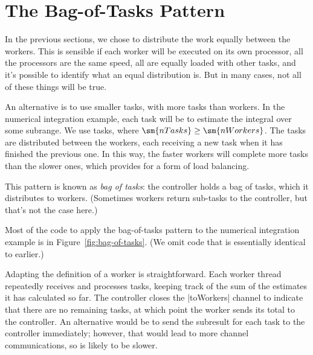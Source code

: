 \section{The Bag-of-Tasks Pattern}

In the previous sections, we chose to distribute the work equally between the
workers.
%
This is sensible if each worker will be executed on its own processor,
all the processors are the same speed, all are equally loaded with other
tasks, and it's possible to identify what an equal distribution is.
%
But in many cases, not all of these things will be true.

An alternative is to use smaller tasks, with more tasks than
workers.
%
In the numerical integration example, each task will be to estimate the
integral over some subrange.   We use  tasks, where
$\sm{nTasks} \ge \sm{nWorkers}$.
%
The tasks are distributed between the workers, each receiving a new task when
it has finished the previous one.  In this way, the faster workers will
complete more tasks than the slower ones, which provides for a form of load
balancing.

This pattern is known as \emph{bag of tasks}: the
controller holds a bag of tasks, which it distributes to workers.  (Sometimes
workers return sub-tasks to the controller, but that's not the case here.)


Most of the code to apply the bag-of-tasks pattern to the numerical
integration example is in Figure~\ref{fig:bag-of-tasks}.  (We omit code that
is essentially identical to earlier.)

Adapting the definition of a worker is straightforward.  Each worker thread
repeatedly receives and processes tasks, keeping track of the sum of the
estimates it has calculated so far.  
%
The controller closes the |toWorkers| channel to indicate that there are no
remaining tasks, at which point the worker sends its total to the controller.
%
An alternative would be to send the subresult for each task to the controller
immediately; however, that would lead to more channel communications, so is
likely to be slower.


